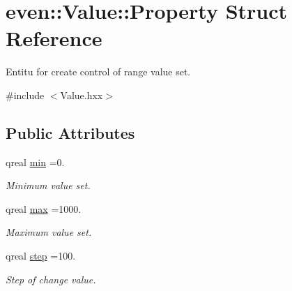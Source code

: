 \hypertarget{structeven_1_1_value_1_1_property}{}\section{even\+:\+:Value\+:\+:Property Struct Reference}
\label{structeven_1_1_value_1_1_property}


Entitu for create control of range value set.  




{\ttfamily \#include $<$Value.\+hxx$>$}

\subsection*{Public Attributes}
\begin{DoxyCompactItemize}
\item 
\mbox{\label{structeven_1_1_value_1_1_property_aab1c19759d5a4473d588b8c1d788b4f9}} 
qreal \mbox{\hyperlink{structeven_1_1_value_1_1_property_aab1c19759d5a4473d588b8c1d788b4f9}{min}} =0.
\begin{DoxyCompactList}\small\item\em Minimum value set. \end{DoxyCompactList}\item 
\mbox{\label{structeven_1_1_value_1_1_property_a6c0071151860f62f8a212f0adc318b2b}} 
qreal \mbox{\hyperlink{structeven_1_1_value_1_1_property_a6c0071151860f62f8a212f0adc318b2b}{max}} =1000.
\begin{DoxyCompactList}\small\item\em Maximum value set. \end{DoxyCompactList}\item 
\mbox{\label{structeven_1_1_value_1_1_property_a82285bce9904774bc603f826728451e6}} 
qreal \mbox{\hyperlink{structeven_1_1_value_1_1_property_a82285bce9904774bc603f826728451e6}{step}} =100.
\begin{DoxyCompactList}\small\item\em Step of change value. \end{DoxyCompactList}\item 
\mbox{\label{structeven_1_1_value_1_1_property_a50b5a79c82d38b4d3a0bb0b8bb3a29ff}} 

\end{DoxyCompactItemize}
